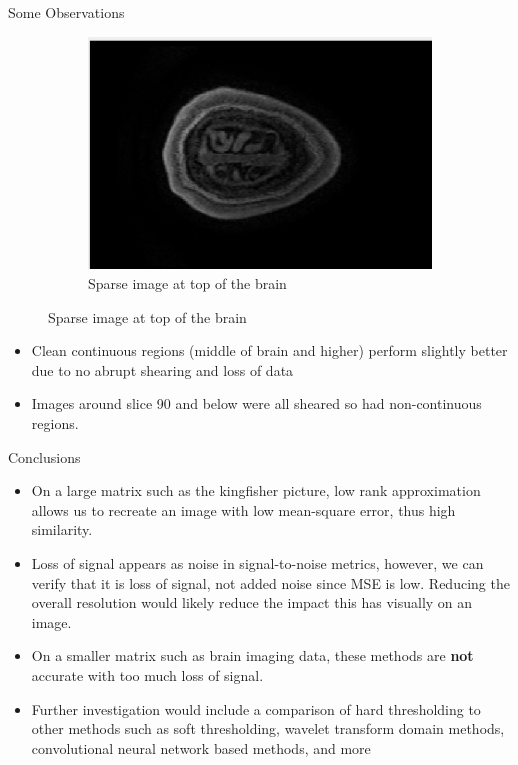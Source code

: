 \documentclass[aspectratio=169,xcolor=dvipsnames]{beamer}
\begin{document}
\begin{frame}{Some Observations}
\begin{figure}
\begin{subfigure}[t]{0.3\textwidth}
				\includegraphics[width=\linewidth]{TopBrainScan.png} 
				\caption{Sparse image at top of the brain}
			\end{subfigure}
		\end{figure}
		\begin{itemize}
			\item Clean continuous regions (middle of brain and higher) perform slightly better due to no abrupt shearing and loss of data
			\item Images around slice 90 and below were all sheared so had non-continuous regions.
		\end{itemize}
	\end{frame}
	

	\begin{frame}{Conclusions}
		\begin{itemize}
			\item On a large matrix such as the kingfisher picture, low rank approximation allows us to recreate an image with low mean-square error, thus high similarity.
			\item Loss of signal appears as noise in signal-to-noise metrics, however, we can verify that it is loss of signal, not added noise since MSE is low. Reducing the overall resolution would likely reduce the impact this has visually on an image.
			\item On a smaller matrix such as brain imaging data, these methods are \textbf{not} accurate with too much loss of signal.
			\item Further investigation would include a comparison of hard thresholding to other methods such as soft thresholding, wavelet	transform domain methods\cite{Taswell2000}, convolutional neural network based methods, and more \cite{Fan2019}
		\end{itemize}
	\end{frame}
		
\end{document}

